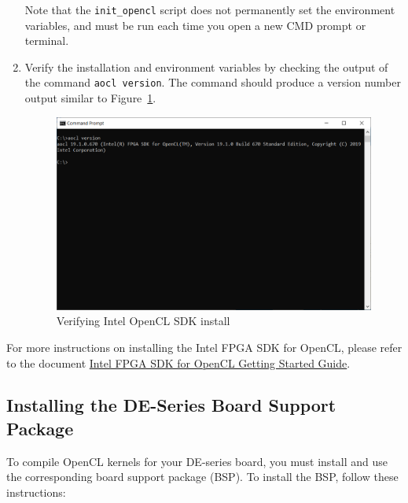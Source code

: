 \documentclass[11pt, twoside, pdftex]{article}
\begin{document}
\begin{enumerate}
Note that the \texttt{init\_opencl} script does not permanently set the environment variables, and must be run each time you open a new CMD prompt or terminal. %


\item Verify the installation and environment variables by checking the output of the command \texttt{aocl version}.
The command should produce a version number output similar to Figure~\ref{fig:verify_intel_ocl_sdk}. 

	\begin{figure} [H]
	\begin{center}
	\includegraphics[scale = 0.5]{figures/fig_aocl_version.png}
	\end{center}
	\caption{Verifying Intel OpenCL SDK install}
	\label{fig:verify_intel_ocl_sdk}
	\end{figure}
\end{enumerate}

For more instructions on installing the Intel FPGA SDK for OpenCL, please refer to the document \href{https://www.altera.com/documentation/mwh1391807309901.html}{Intel FPGA SDK for OpenCL Getting Started Guide}.

\subsection{Installing the DE-Series Board Support Package}
\label{sec:install_bsp}

To compile OpenCL kernels for your DE-series board, you must install and use the corresponding board support package (BSP). To install the BSP, follow these instructions:
\end{document}
